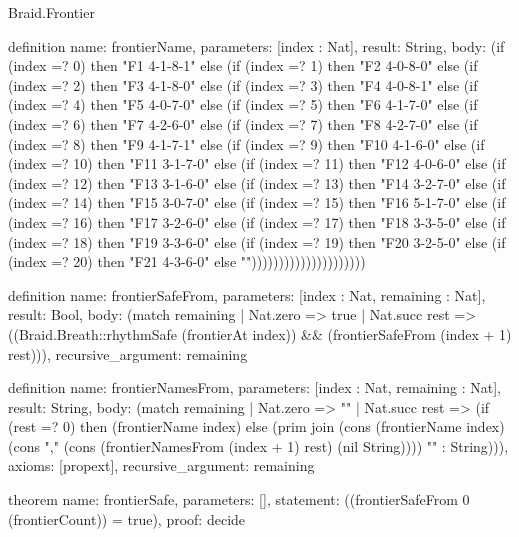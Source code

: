 \begin{lexlean}{Braid.Frontier}
\begin{semanticmodule}
definition{
  name: frontierName,
  parameters: [index : Nat],
  result: String,
  body: (if (index =? 0) then "F1 4-1-8-1" else (if (index =? 1) then "F2 4-0-8-0" else (if (index =? 2) then "F3 4-1-8-0" else (if (index =? 3) then "F4 4-0-8-1" else (if (index =? 4) then "F5 4-0-7-0" else (if (index =? 5) then "F6 4-1-7-0" else (if (index =? 6) then "F7 4-2-6-0" else (if (index =? 7) then "F8 4-2-7-0" else (if (index =? 8) then "F9 4-1-7-1" else (if (index =? 9) then "F10 4-1-6-0" else (if (index =? 10) then "F11 3-1-7-0" else (if (index =? 11) then "F12 4-0-6-0" else (if (index =? 12) then "F13 3-1-6-0" else (if (index =? 13) then "F14 3-2-7-0" else (if (index =? 14) then "F15 3-0-7-0" else (if (index =? 15) then "F16 5-1-7-0" else (if (index =? 16) then "F17 3-2-6-0" else (if (index =? 17) then "F18 3-3-5-0" else (if (index =? 18) then "F19 3-3-6-0" else (if (index =? 19) then "F20 3-2-5-0" else (if (index =? 20) then "F21 4-3-6-0" else "")))))))))))))))))))))
}

definition{
  name: frontierSafeFrom,
  parameters: [index : Nat, remaining : Nat],
  result: Bool,
  body: (match remaining
    | Nat.zero => true
    | Nat.succ rest => ((Braid.Breath::rhythmSafe (frontierAt index)) && (frontierSafeFrom (index + 1) rest))),
  recursive_argument: remaining
}

definition{
  name: frontierNamesFrom,
  parameters: [index : Nat, remaining : Nat],
  result: String,
  body: (match remaining
    | Nat.zero => ""
    | Nat.succ rest => (if (rest =? 0) then (frontierName index) else (prim join (cons (frontierName index) (cons "," (cons (frontierNamesFrom (index + 1) rest) (nil String)))) "" : String))),
  axioms: [propext],
  recursive_argument: remaining
}

theorem{
  name: frontierSafe,
  parameters: [],
  statement: ((frontierSafeFrom 0 (frontierCount)) = true),
  proof: decide{}
}
\end{semanticmodule}
\end{lexlean}
